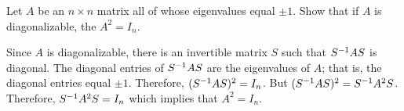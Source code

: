 \documentclass{ximera}
\begin{document}
\begin{exercise} \label{c10.3.6C}
Let $A$ be an $n\times n$ matrix all of whose eigenvalues equal $\pm 1$. Show
that if $A$ is diagonalizable, the $A^2=I_n$.

\begin{solution}
Since $A$ is diagonalizable, there is an invertible matrix $S$ such 
that $S^{-1} AS$ is diagonal.  The diagonal entries of  $S^{-1} AS$ are the eigenvalues
of $A$; that is, the diagonal entries equal $\pm 1$.  Therefore, $(S^{-1} AS)^2=I_n$.
But $(S^{-1} AS)^2 = S^{-1} A^2 S$.   Therefore, $S^{-1} A^2 S=I_n$ which implies that
$A^2=I_n$.

\end{solution}
\end{exercise}
\end{document}
